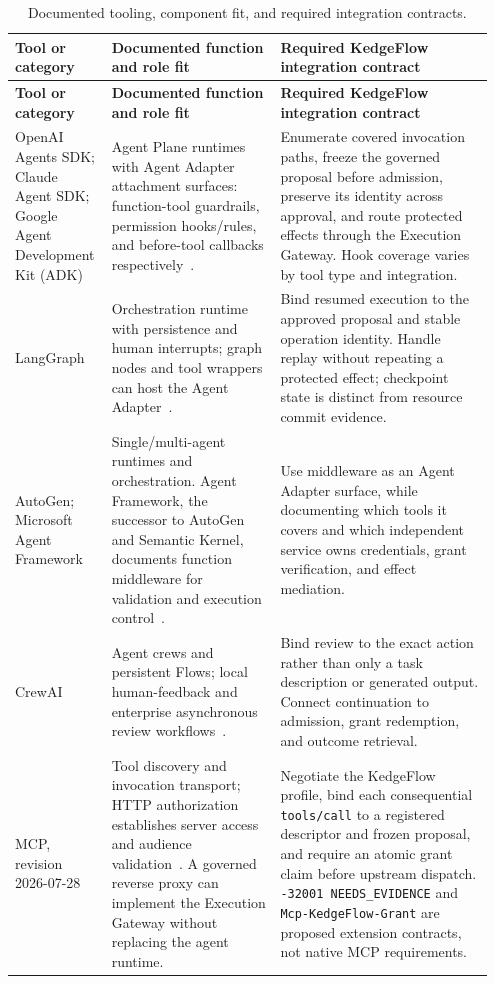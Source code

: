 {\small
\setlength{\LTleft}{0pt}
\setlength{\LTright}{0pt}
\begin{longtable}{@{}L{0.18\linewidth}L{0.34\linewidth}L{0.43\linewidth}@{}}
\caption{Documented tooling, component fit, and required integration contracts.}\label{tab:ecosystem-audit}\\
\toprule
\textbf{Tool or category} & \textbf{Documented function and role fit} & \textbf{Required KedgeFlow integration contract}\\
\midrule
\endfirsthead
\toprule
\textbf{Tool or category} & \textbf{Documented function and role fit} & \textbf{Required KedgeFlow integration contract}\\
\midrule
\endhead
\bottomrule
\endfoot
OpenAI Agents SDK; Claude Agent SDK; Google Agent Development Kit (ADK) & Agent Plane runtimes with Agent Adapter attachment surfaces: function-tool guardrails, permission hooks/rules, and before-tool callbacks respectively~\cite{openaiagents2026,claudeagents2026,adk2026}. & Enumerate covered invocation paths, freeze the governed proposal before admission, preserve its identity across approval, and route protected effects through the Execution Gateway. Hook coverage varies by tool type and integration.\\
\addlinespace
LangGraph & Orchestration runtime with persistence and human interrupts; graph nodes and tool wrappers can host the Agent Adapter~\cite{langgraph2026,langgraphoverview2026}. & Bind resumed execution to the approved proposal and stable operation identity. Handle replay without repeating a protected effect; checkpoint state is distinct from resource commit evidence.\\
\addlinespace
AutoGen; Microsoft Agent Framework & Single/multi-agent runtimes and orchestration. Agent Framework, the successor to AutoGen and Semantic Kernel, documents function middleware for validation and execution control~\cite{autogen2026,msagent2026,msagentmiddleware2026}. & Use middleware as an Agent Adapter surface, while documenting which tools it covers and which independent service owns credentials, grant verification, and effect mediation.\\
\addlinespace
CrewAI & Agent crews and persistent Flows; local human-feedback and enterprise asynchronous review workflows~\cite{crewai2026,crewaihitl2026}. & Bind review to the exact action rather than only a task description or generated output. Connect continuation to admission, grant redemption, and outcome retrieval.\\
\addlinespace
MCP, revision 2026-07-28 & Tool discovery and invocation transport; HTTP authorization establishes server access and audience validation~\cite{mcp2026,mcpauth2026}. A governed reverse proxy can implement the Execution Gateway without replacing the agent runtime. & Negotiate the KedgeFlow profile, bind each consequential \texttt{tools/call} to a registered descriptor and frozen proposal, and require an atomic grant claim before upstream dispatch. \texttt{-32001 NEEDS\_EVIDENCE} and \texttt{Mcp-KedgeFlow-Grant} are proposed extension contracts, not native MCP requirements.\\

\end{longtable}}
